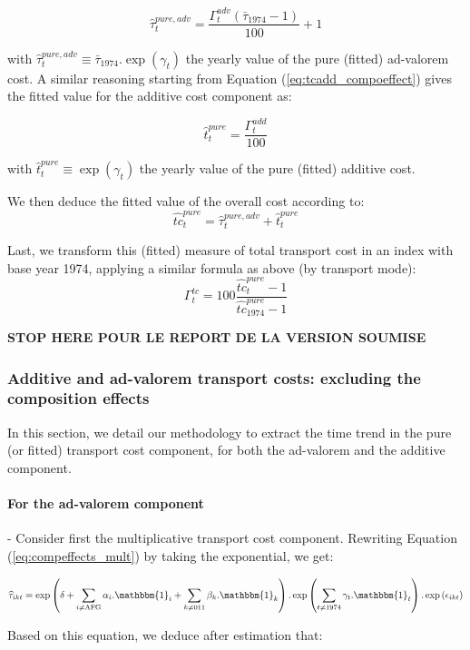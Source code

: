 \documentclass[a4paper,11pt]{article}
\begin{document}
$$\widehat{\tau}^{pure, adv}_t = \frac{\Gamma^{adv}_t \left(\bar{\tau}_{1974}-1\right)}{100} +1$$

with $\widehat{\tau}^{pure, adv}_t \equiv \bar{\tau}_{1974}.\exp(\gamma_t)$ the yearly value of the pure (fitted) ad-valorem cost.
A similar reasoning starting from Equation (\ref{eq:tcadd_compoeffect}) gives the fitted value for the additive cost component as:

$$\widehat{t}^{pure}_t = \frac{\Gamma^{add}_t}{100}$$

with $\widehat{t}^{pure}_t \equiv \exp(\gamma_t)$ the yearly value of the pure (fitted) additive cost.


We then deduce the fitted value of the overall cost according to:
$$\widehat{tc}^{pure}_t= \widehat{\tau}^{pure, adv}_t  + \widehat{t}^{pure}_t$$

Last, we transform this (fitted) measure of total transport cost in an index with base year 1974, applying a similar formula as above (by transport mode):
$$\Gamma^{tc}_t = 100\frac{\widehat{tc}^{pure}_t -1 }{\widehat{tc}^{pure}_{1974}-1}$$

\textbf{STOP HERE POUR LE REPORT DE LA VERSION SOUMISE}


\subsubsection{Additive and ad-valorem transport costs: excluding the composition effects}

In this section, we detail our methodology to extract the time trend in the pure (or fitted) transport cost component, for both the ad-valorem and the additive component.

\paragraph{For the ad-valorem component} - Consider first the multiplicative transport cost component.
Rewriting Equation (\ref{eq:compeffects_mult}) by taking the exponential, we get:

\begin{equation*}
\widehat{\tau}_{ikt}=\exp\left(\delta + \sum_{i \neq \text{AFG}}\alpha_i.\mathbbm{1}_i+\sum_{k\neq \text{011}}\beta_k.\mathbbm{1}_k\right).\exp\left(\sum_{t \neq 1974}\gamma_t.\mathbbm{1}_t\right) .\exp\left(\epsilon_{ikt}\right)
\end{equation*}

Based on this equation, we deduce after estimation that:
\end{document}
